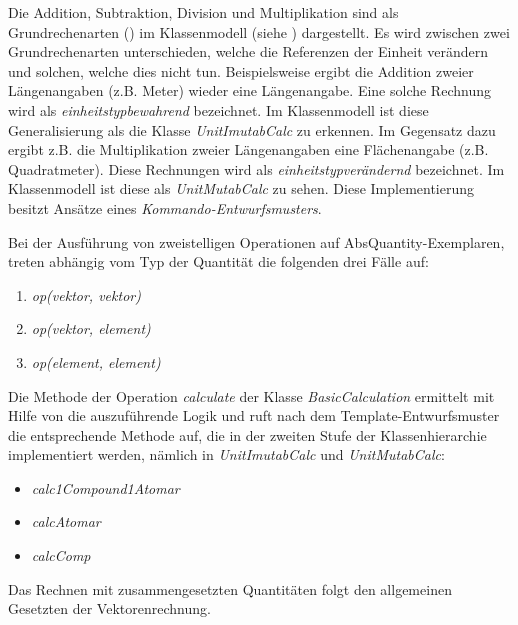 \label{Berechnungen}


Die Addition, Subtraktion, Division und Multiplikation sind als Grundrechenarten () im Klassenmodell (siehe ) dargestellt. 
Es wird zwischen zwei Grundrechenarten unterschieden, welche die Referenzen der Einheit verändern und solchen, welche dies nicht tun. 
Beispielsweise ergibt die Addition zweier Längenangaben (z.B. Meter) wieder eine Längenangabe. 
Eine solche Rechnung wird als \emph{einheitstypbewahrend} bezeichnet. Im Klassenmodell ist diese Generalisierung als die Klasse \textit{UnitImutabCalc} zu erkennen. 
Im Gegensatz dazu ergibt z.B. die Multiplikation zweier Längenangaben eine Flächenangabe (z.B. Quadratmeter). 
Diese Rechnungen wird als \emph{einheitstypverändernd} bezeichnet. Im Klassenmodell ist diese als \textit{UnitMutabCalc} zu sehen. 
Diese Implementierung besitzt Ansätze eines \emph{Kommando-Entwurfsmusters}.

\newpage
{}

Bei der Ausführung von zweistelligen Operationen auf AbsQuantity-Exemplaren, 
treten abhängig vom Typ der Quantität die folgenden drei Fälle auf:
\begin{enumerate}
\item \textit{op(vektor, vektor)}
\item \textit{op(vektor, element)}
\item \textit{op(element, element)}
\end{enumerate}

Die Methode der Operation \textit{calculate} der Klasse \textit{BasicCalculation} ermittelt mit Hilfe von  die auszuführende Logik und ruft nach dem Template-Entwurfsmuster die entsprechende Methode auf, die in der zweiten Stufe der Klassenhierarchie implementiert werden, nämlich in \textit{UnitImutabCalc} und \textit{UnitMutabCalc}:
\begin{itemize}
\item \textit{calc1Compound1Atomar}
\item \textit{calcAtomar}
\item \textit{calcComp}
\end{itemize}

Das Rechnen mit zusammengesetzten Quantitäten folgt den allgemeinen Gesetzten der Vektorenrechnung.

